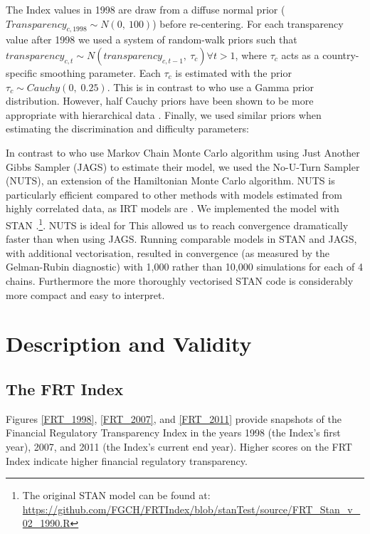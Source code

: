 \documentclass[a4paper]{article}
\begin{document}
The Index values in 1998 are draw from a diffuse normal prior ($Transparency_{c,1998} \sim N(0,\:100)$) before re-centering. For each transparency value after 1998 we used a system of random-walk priors such that $transparency_{c,t} \sim N(transparency_{c,t-1},\: \tau_{c}) \forall t > 1$, where $\tau_{c}$ acts as a country-specific smoothing parameter. Each $\tau_{c}$ is estimated with the prior $\tau_{c} \sim Cauchy(0,\;0.25)$. This is in contrast to \cite{Hollyer2014} who use a Gamma prior distribution. However, half Cauchy priors have been shown to be more appropriate with hierarchical data \cite[see][]{Gelman2006,Polson2012}. Finally, we used similar priors when estimating the discrimination and difficulty parameters:

In contrast to \cite{Hollyer2014} who use Markov Chain Monte Carlo algorithm using Just Another Gibbs Sampler (JAGS) to estimate their model, we used the No-U-Turn Sampler (NUTS), an extension of the Hamiltonian Monte Carlo algorithm. NUTS is particularly efficient compared to other methods with models estimated from highly correlated data, as IRT models are \citep{hoffmangelman2013}. We implemented the model with STAN \citep{stan-manual:2014}.\footnote{The original STAN model can be found at: \url{https://github.com/FGCH/FRTIndex/blob/stanTest/source/FRT_Stan_v_02_1990.R}}. NUTS is ideal for  This allowed us to reach convergence dramatically faster than when using JAGS. Running comparable models in STAN and JAGS, with additional vectorisation, resulted in convergence (as measured by the Gelman-Rubin diagnostic) with 1,000 rather than 10,000 simulations for each of 4 chains. Furthermore the more thoroughly vectorised STAN code is considerably more compact and easy to interpret.

\section{Description and Validity}


\subsection{The FRT Index}

Figures \ref{FRT_1998}, \ref{FRT_2007}, and \ref{FRT_2011} provide snapshots of the Financial Regulatory Transparency Index in the years 1998 (the Index's first year), 2007, and 2011 (the Index's current end year). Higher scores on the FRT Index indicate higher financial regulatory transparency.
\end{document}
